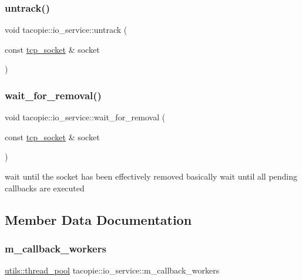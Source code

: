 \subsubsection{\texorpdfstring{untrack()}{untrack()}}
{\footnotesize\ttfamily void tacopie\+::io\+\_\+service\+::untrack (\begin{DoxyParamCaption}\item[{const \hyperlink{classtacopie_1_1tcp__socket}{tcp\+\_\+socket} \&}]{socket }\end{DoxyParamCaption})}

\mbox{\label{classtacopie_1_1io__service_aa57db619baeaa6db0aeb22e67b895cd7}} 
\subsubsection{\texorpdfstring{wait\+\_\+for\+\_\+removal()}{wait\_for\_removal()}}
{\footnotesize\ttfamily void tacopie\+::io\+\_\+service\+::wait\+\_\+for\+\_\+removal (\begin{DoxyParamCaption}\item[{const \hyperlink{classtacopie_1_1tcp__socket}{tcp\+\_\+socket} \&}]{socket }\end{DoxyParamCaption})}

wait until the socket has been effectively removed basically wait until all pending callbacks are executed 

\subsection{Member Data Documentation}
\mbox{\label{classtacopie_1_1io__service_ace8ecb6c752a0adb3b2fec1c92cf1161}} 
\subsubsection{\texorpdfstring{m\+\_\+callback\+\_\+workers}{m\_callback\_workers}}
{\footnotesize\ttfamily \hyperlink{classtacopie_1_1utils_1_1thread__pool}{utils\+::thread\+\_\+pool} tacopie\+::io\+\_\+service\+::m\+\_\+callback\+\_\+workers\hspace{0.3cm}{\ttfamily [private]}}

